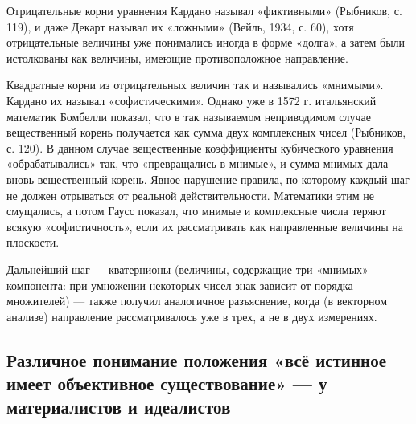 Отрицательные корни уравнения Кардано называл «фиктивными» (Рыбников,
с. 119), и даже Декарт называл их «ложными» (Вейль, 1934, с. 60), хотя
отрицательные величины уже понимались иногда в форме «долга», а затем
были истолкованы как величины, имеющие противоположное направление.

Квадратные корни из отрицательных величин так и назывались «мнимыми».
Кардано их называл «софистическими». Однако уже в 1572 г. итальянский
математик Бомбелли показал, что в так называемом неприводимом случае
вещественный корень получается как сумма двух комплексных чисел
(Рыбников, с. 120). В данном случае вещественные коэффициенты
кубического уравнения «обрабатывались» так, что «превращались в
мнимые», и сумма мнимых дала вновь вещественный корень. Явное
нарушение правила, по которому каждый шаг не должен отрываться от
реальной действительности. Математики этим не смущались, а потом Гаусс
показал, что мнимые и комплексные числа теряют всякую «софистичность»,
если их рассматривать как направленные величины на плоскости.

Дальнейший шаг --- кватернионы (величины, содержащие три «мнимых»
компонента: при умножении некоторых чисел знак зависит от порядка
множителей) --- также получил аналогичное разъяснение, когда (в
векторном анализе) направление рассматривалось уже в трех, а не в двух
измерениях.

\subsection{Различное понимание положения «всё истинное имеет
объективное существование» --- у материалистов и идеалистов}

